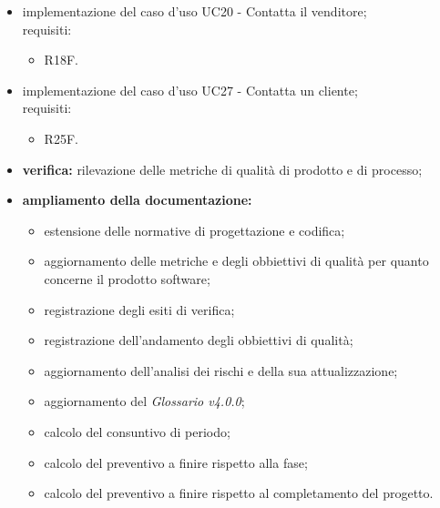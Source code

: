 \begin{itemize}
    \item implementazione del caso d'uso UC20 - Contatta il venditore;\\requisiti:
          \begin{itemize}
              \item R18F.
          \end{itemize}
    \item implementazione del caso d'uso UC27 - Contatta un cliente;\\requisiti:
          \begin{itemize}
              \item R25F.
          \end{itemize}
    \item \textbf{verifica:} rilevazione delle metriche di qualità di prodotto e di processo;
    \item \textbf{ampliamento della documentazione:}
          \begin{itemize}
              \item estensione delle normative di progettazione e codifica;
              \item aggiornamento delle metriche e degli obbiettivi di qualità per quanto concerne il prodotto software;
              \item registrazione degli esiti di verifica;
              \item registrazione dell'andamento degli obbiettivi di qualità;
              \item aggiornamento dell'analisi dei rischi e della sua attualizzazione;
              \item aggiornamento del \textit{Glossario v4.0.0};
              \item calcolo del consuntivo di periodo;
              \item calcolo del preventivo a finire rispetto alla fase;
              \item calcolo del preventivo a finire rispetto al completamento del progetto.
          \end{itemize}
\end{itemize}


